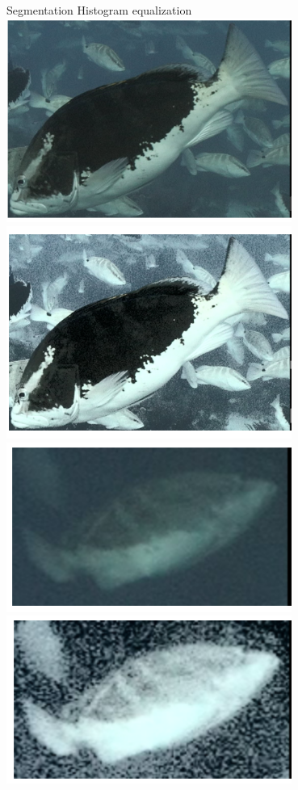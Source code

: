 

 \begin{frame}{Segmentation}
    Histogram equalization
    \centering
         \includegraphics[height=0.7\textheight,width=0.7\textwidth,keepaspectratio]{images/gm4-1.png}
         \includegraphics[height=0.7\textheight,width=0.7\textwidth,keepaspectratio]{images/gm4-2.png}
         \includegraphics[height=0.7\textheight,width=0.7\textwidth,keepaspectratio]{images/gm4-4.png}
         \includegraphics[height=0.7\textheight,width=0.7\textwidth,keepaspectratio]{images/gm4-3.png}



 \end{frame}

